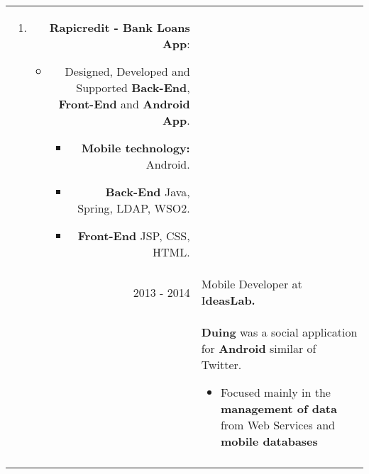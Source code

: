 \documentclass[a4paper,11pt]{article} %
\begin{document}
\begin{tabular}{r|p{12cm}}
{\begin{enumerate}
\begin{itemize}
\begin{itemize}
\end{itemize}
\end{itemize}
\item \textbf{Rapicredit  - Bank Loans App}:
\begin{itemize}
\item Designed, Developed and Supported \textbf{Back-End}, \textbf{Front-End} and \textbf{Android App}.
\begin{itemize}
\item \textbf{Mobile technology:} Android.
\item \textbf{Back-End} Java, Spring, LDAP, WSO2.
\item \textbf{Front-End} JSP, CSS, HTML.
\end{itemize}
\end{itemize}
\end{enumerate}} \\
\textsc{2013 - 2014} & Mobile Developer at I\textbf{deasLab.}\\
& \footnotesize{\textbf{Duing} was a social application for \textbf{Android} similar of Twitter.}
\begin{itemize}
\item Focused mainly in the \textbf{management of data} from Web Services and \textbf{mobile databases}
\end{itemize}\\
\multicolumn{2}{c}{} \\
\end{tabular}

\end{document}
